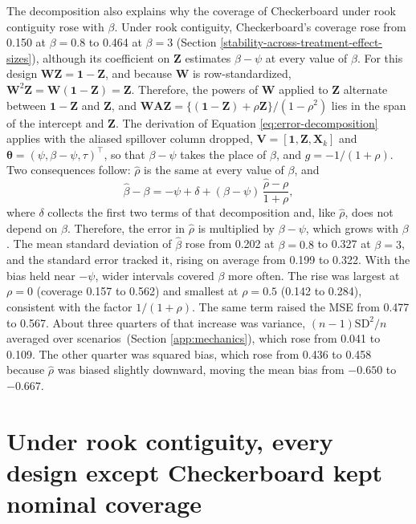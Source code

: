 \documentclass[11pt]{article}
\begin{document}
\iffullsi
The decomposition also explains why the coverage of Checkerboard
under rook contiguity rose with \(\beta\). Under rook contiguity,
Checkerboard's coverage rose from 0.150 at \(\beta = 0.8\) to 0.464 at
\(\beta = 3\) (Section \ref{stability-across-treatment-effect-sizes}), although its
coefficient on \(\mathbf{Z}\) estimates \(\beta - \psi\) at every value of
\(\beta\). For this design \(\mathbf{W}\mathbf{Z} = \mathbf{1} - \mathbf{Z}\), and because \(\mathbf{W}\) is
row-standardized, \(\mathbf{W}^2 \mathbf{Z} = \mathbf{W}(\mathbf{1} - \mathbf{Z}) = \mathbf{Z}\). Therefore, the powers of \(\mathbf{W}\) applied to \(\mathbf{Z}\) alternate between \(\mathbf{1} - \mathbf{Z}\) and \(\mathbf{Z}\), and
\(\mathbf{W}\mathbf{A}\mathbf{Z} = \{(\mathbf{1} - \mathbf{Z}) + \rho \mathbf{Z}\}/(1 - \rho^2)\) lies in the span of the
intercept and \(\mathbf{Z}\). The derivation of Equation
\ref{eq:error-decomposition} applies with the aliased spillover column
dropped, \(\mathbf{V} = [\mathbf{1}, \mathbf{Z}, \mathbf{X}_k]\) and
\(\boldsymbol{\theta} = (\psi, \beta - \psi, \tau)^\top\), so that
\(\beta - \psi\) takes the place of \(\beta\), and
\(g = -1/(1 + \rho)\). Two consequences follow: \(\hat\rho\) is the same
at every value of \(\beta\), and \[
\hat\beta - \beta = -\psi + \delta + (\beta - \psi)\,\frac{\hat\rho - \rho}{1 + \rho},
\] where \(\delta\) collects the first two terms of that decomposition
and, like \(\hat\rho\), does not depend on \(\beta\). Therefore, the error in \(\hat\rho\) is multiplied by \(\beta - \psi\), which grows
with \(\beta\). The mean standard deviation of \(\hat\beta\) rose from
0.202 at \(\beta = 0.8\) to 0.327 at \(\beta = 3\), and the standard error
tracked it, rising on average from 0.199 to 0.322. With the bias held
near \(-\psi\), wider intervals covered \(\beta\) more often. The rise
was largest at \(\rho = 0\) (coverage 0.157 to 0.562) and smallest at \(\rho = 0.5\) (0.142 to 0.284), consistent with the factor
\(1/(1 + \rho)\). The same term raised the MSE from 0.477 to 0.567.
About three quarters of that increase was variance,
\((n-1)\text{SD}^2/n\) averaged over scenarios\iffullsi\ (Section
\ref{app:mechanics})\fi, which rose from 0.041 to 0.109. The other quarter
was squared bias, which rose from 0.436 to 0.458 because \(\hat\rho\)
was biased slightly downward, moving the mean bias from \(-0.650\) to
\(-0.667\).
\fi



\FloatBarrier
\section{Under rook contiguity, every design except Checkerboard kept nominal coverage}\label{rook-contiguity}\label{app:rook-figures}
\end{document}
